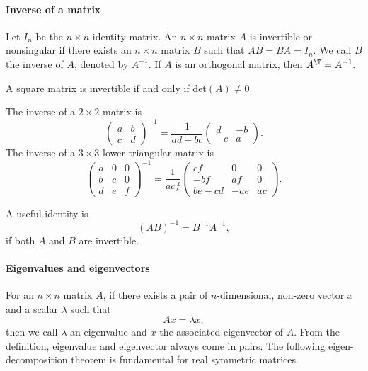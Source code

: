 \paragraph*{Inverse of a matrix}

Let $I_{n}$ be the $n\times n$ identity matrix. An $n\times n$
matrix $A$ is invertible or nonsingular if there exists an $n\times n$ matrix
$B$ such that $AB=BA=I_{n}.$ We call $B$ the inverse of $A$, denoted
by $A^{-1}.$  If $A$ is an orthogonal matrix, then $A^{\T} =A^{-1}.$



A square matrix is invertible if and only if det$(A) \neq 0.$


The inverse of a $2\times 2$ matrix is
\begin{equation}
\label{eq::2X2-inverse}
\begin{pmatrix}
a & b \\
c& d
\end{pmatrix}^{-1}
= \frac{1}{ad - bc} \begin{pmatrix}
d & -b \\
-c& a
\end{pmatrix}.
\end{equation}
The inverse of a $3\times 3$ lower triangular matrix is
\begin{equation}
\label{eq::3X3-lower-inverse}
\left(\begin{array}{lll}
a & 0 & 0 \\
b & c & 0 \\
d & e & f
\end{array}\right)^{-1}=\frac{1}{a c f}\left(\begin{array}{ccc}
c f & 0 & 0 \\
-b f & a f & 0 \\
b e-c d & -a e & a c
\end{array}\right). 
\end{equation}



A useful identity is
$$
(AB)^{-1}  = B^{-1} A^{-1}, 
$$
if both $A$ and $B$ are invertible. 



\paragraph*{Eigenvalues and eigenvectors}

For an $n\times n$ matrix $A$, if there exists a pair of $n$-dimensional, non-zero
vector $x$ and a scalar $\lambda$ such that 
$$
Ax=\lambda x,
$$ 
then we call $\lambda$ an eigenvalue and $x$ the associated eigenvector of $A$. From
the definition, eigenvalue and eigenvector always come in pairs. The
following eigen-decomposition theorem is fundamental for real symmetric
matrices.

